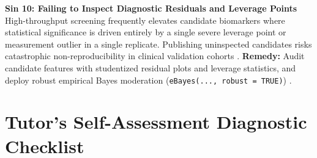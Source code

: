 \documentclass[11pt,twoside,openright]{book}
\begin{document}
\begin{pitfallbox}
\textbf{Sin 10: Failing to Inspect Diagnostic Residuals and Leverage Points}\\
High-throughput screening frequently elevates candidate biomarkers where statistical significance is driven entirely by a single severe leverage point or measurement outlier in a single replicate. Publishing uninspected candidates risks catastrophic non-reproducibility in clinical validation cohorts \cite{broadhurst2006statistical, broadhurst2018guidelines}. \textbf{Remedy:} Audit candidate features with studentized residual plots and leverage statistics, and deploy robust empirical Bayes moderation (\texttt{eBayes(..., robust = TRUE)}) \cite{phipson2016robust}.
\end{pitfallbox}


\section{Tutor's Self-Assessment Diagnostic Checklist}
\end{document}
